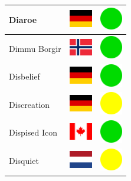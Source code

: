 \documentclass[12pt, a4paper, twoside]{report}
\begin{document}
\begin{center}
\begin{longtable}{|p{5cm}|p{2cm}|p{2cm}|}
 Diaroe                                                     & \includegraphics[width=1cm]{4x3/de} &   \includegraphics[width=1cm]{likes/y} \\ \hline
 Dimmu Borgir                                               & \includegraphics[width=1cm]{4x3/no} &   \includegraphics[width=1cm]{likes/y} \\ \hline
 Disbelief                                                  & \includegraphics[width=1cm]{4x3/de} &   \includegraphics[width=1cm]{likes/y} \\ \hline
 Discreation                                                & \includegraphics[width=1cm]{4x3/de} &   \includegraphics[width=1cm]{likes/m} \\ \hline
 Dispised Icon                                              & \includegraphics[width=1cm]{4x3/ca} &   \includegraphics[width=1cm]{likes/y} \\ \hline
 Disquiet                                                   & \includegraphics[width=1cm]{4x3/nl} &   \includegraphics[width=1cm]{likes/m} \\ \hline

\end{longtable}
\end{center}
\end{document}
